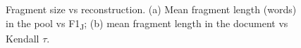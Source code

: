 \begin{figure}[t]\centering

\caption{Fragment size vs reconstruction. (a) Mean fragment length (words) in the pool vs F1\textsubscript{J}; (b) mean fragment length in the document vs Kendall $\tau$.}
\label{fig:8}
\end{figure}
